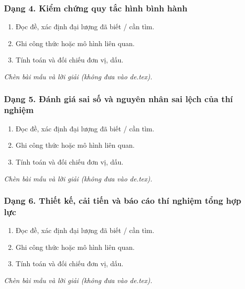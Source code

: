 \subsubsection{Dạng 4. Kiểm chứng quy tắc hình bình hành}
\begin{phuongphap}
\begin{enumerate}
\item Đọc đề, xác định đại lượng đã biết / cần tìm.
\item Ghi công thức hoặc mô hình liên quan.
\item Tính toán và đối chiếu đơn vị, dấu.
\end{enumerate}
\end{phuongphap}
\begin{vidumau}
\textit{Chèn bài mẫu và lời giải (không đưa vào de.tex).}
\end{vidumau}

\subsubsection{Dạng 5. Đánh giá sai số và nguyên nhân sai lệch của thí nghiệm}
\begin{phuongphap}
\begin{enumerate}
\item Đọc đề, xác định đại lượng đã biết / cần tìm.
\item Ghi công thức hoặc mô hình liên quan.
\item Tính toán và đối chiếu đơn vị, dấu.
\end{enumerate}
\end{phuongphap}
\begin{vidumau}
\textit{Chèn bài mẫu và lời giải (không đưa vào de.tex).}
\end{vidumau}

\subsubsection{Dạng 6. Thiết kế, cải tiến và báo cáo thí nghiệm tổng hợp lực}
\begin{phuongphap}
\begin{enumerate}
\item Đọc đề, xác định đại lượng đã biết / cần tìm.
\item Ghi công thức hoặc mô hình liên quan.
\item Tính toán và đối chiếu đơn vị, dấu.
\end{enumerate}
\end{phuongphap}
\begin{vidumau}
\textit{Chèn bài mẫu và lời giải (không đưa vào de.tex).}
\end{vidumau}

